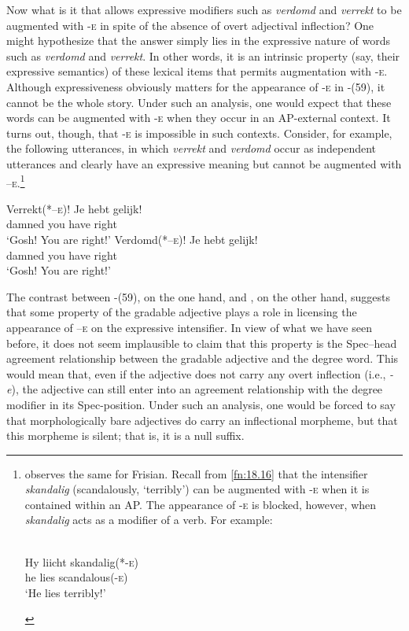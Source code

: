 \documentclass[output=paper]{langsci/langscibook}
\begin{document}
Now what is it that allows expressive modifiers such as \emph{verdomd} and
\emph{verrekt} to be augmented with \textsc{-e}  in spite of the absence of
overt adjectival inflection? One might hypothesize that the answer simply lies
in the expressive nature of words such as \emph{verdomd} and \emph{verrekt}. In
other words, it is an intrinsic property (say, their expressive semantics) of
these lexical items that permits augmentation with \textsc{-e}. Although
expressiveness obviously matters for the appearance of \textsc{-e} in
-(59), it cannot be the whole story. Under such an analysis, one
would expect that these words can be augmented with \textsc{-e} when they occur
in an AP-external context. It turns out, though,  that \textsc{-e} is
impossible in such contexts. Consider, for example, the following utterances,
in which \emph{verrekt} and \emph{verdomd} occur as independent utterances and
clearly have an expressive meaning but cannot be augmented with
\textsc{–e.}\footnote{\citet{Verdenius1939} observes the same for Frisian.
    Recall from \cref{fn:18.16} that the intensifier \emph{skandalig}
    (scandalously, \enquote*{terribly}) can be augmented with \textsc{-e} when
    it is contained within an AP. The appearance of \textsc{-e} is blocked,
    however, when \emph{skandalig} acts as a modifier of a verb. For example:

\begin{exe}
    \\
    \gll Hy liicht skandalig(*\textsc{-e})\\
    	 he lies scandalous(\textsc{-e})\\
    \glt \enquote*{He lies terribly!}
\end{exe}}

\ea%
    \label{ex:key:18.60}
	\ea
	\gll Verrekt(*\textsc{–e})!  Je      hebt    gelijk!\\
		damned            you  have  right\\
	\glt ‘Gosh! You are right!’
	\ex
	\gll Verdomd(*\textsc{–e})!  Je      hebt    gelijk!\\
		damned                you  have  right\\
	\glt ‘Gosh! You are right!’
	\z
\z

The contrast between -(59), on the one hand, and
, on the other hand, suggests that some property of the gradable
adjective plays a role in licensing the appearance of  \textsc{–e} on the
expressive intensifier. In view of what we have seen before, it does not seem
implausible to claim that this property is the Spec--head agreement relationship
between the gradable adjective and the degree word. This would mean that, even
if the adjective does not carry any overt inflection (i.e., \emph{-e}), the
adjective can still enter into an agreement relationship with the degree
modifier in its Spec-position. Under such an analysis, one would be forced to
say that morphologically bare adjectives do carry an inflectional morpheme, but
that this morpheme is silent; that is, it is a null suffix.
\end{document}
